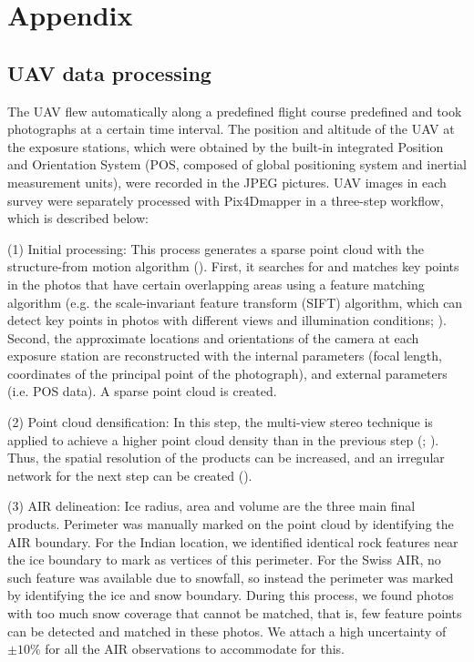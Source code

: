\documentclass[utf8]{frontiersSCNS} %
\begin{document}
\section{Appendix}

\subsection{UAV data processing} \label{sec:uav}
The UAV flew automatically along a predefined flight course predefined and took photographs at a certain time interval. The position and
altitude of the UAV at the exposure stations, which were obtained by the built-in integrated Position and
Orientation System (POS, composed of global positioning system and inertial measurement units), were recorded in
the JPEG pictures. UAV images in each survey were separately processed with Pix4Dmapper in a three-step workflow,
which is described below:

(1) Initial processing: This process generates a sparse point cloud with the structure-from motion algorithm
(\cite{Turner_2012}). First, it searches for and matches key points in the photos that have certain overlapping
areas using a feature matching algorithm (e.g. the scale-invariant feature transform (SIFT) algorithm, which can
detect key points in photos with different views and illumination conditions; \cite{Lowe_2004}). Second, the
approximate locations and orientations of the camera at each exposure station are reconstructed with the internal
parameters (focal length, coordinates of the principal point of the photograph), and external parameters (i.e. POS
data). A sparse point cloud is created.

(2) Point cloud densification: In this step, the multi-view stereo technique is applied to achieve a higher point
cloud density than in the previous step (\cite{Furukawa_2010}; \cite{Molg_2017}). Thus, the spatial resolution of
the products can be increased, and an irregular network for the next step can be created (\cite{Kung_2011}).

(3) AIR delineation: Ice radius, area and volume are the three main final products. Perimeter was manually marked
on the point cloud by identifying the AIR boundary. For the Indian location, we identified identical rock features
near the ice boundary to mark as vertices of this perimeter. For the Swiss AIR, no such feature was available due
to snowfall, so instead the perimeter was marked by identifying the ice and snow boundary. During this process, we found photos with too much snow coverage that cannot be matched, that is, few feature
points can be detected and matched in these photos. We attach a high uncertainty of $\pm 10 \%$ for all the AIR observations to accommodate for this.
\end{document}
